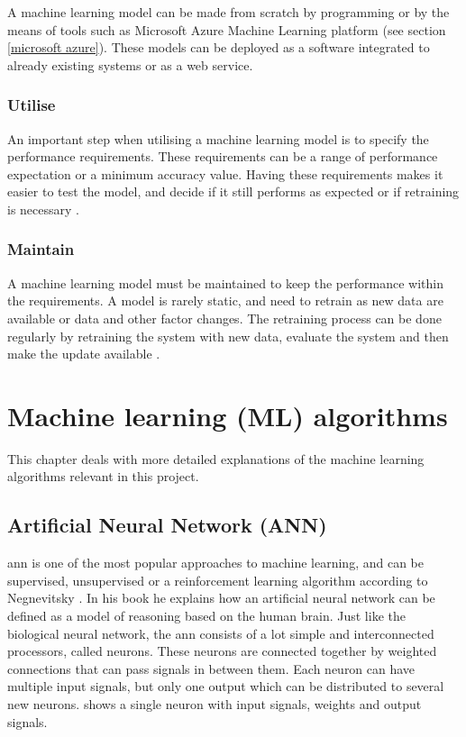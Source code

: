 \documentclass[english, a4paper]{report}
\begin{document}
{{{            A machine learning model can be made from scratch by programming or by the means of tools such as Microsoft Azure Machine Learning platform (see section \ref{microsoft azure}). These models can be deployed as a software integrated to already existing systems or as a web service. 

            \subsubsection{Utilise}
            {
                An important step when utilising a machine learning model is to specify the performance requirements. These requirements can be a range of performance expectation or a minimum accuracy value. Having these requirements makes it easier to test the model, and decide if it still performs as expected or if retraining is necessary \cite{mlMarsland}. 
            }
            
            \subsubsection{Maintain}
            {
                A machine learning model must be maintained to keep the performance within the requirements. A model is rarely static, and need to retrain as new data are available or data and other factor changes. The retraining process can be done regularly by retraining the system with new data, evaluate the system and then make the update available \cite{deployML}. 
            }
        }
    }
    
    \section{Machine learning (ML) algorithms}\label{algorithms}
    {
        This chapter deals with more detailed explanations of the machine learning algorithms relevant in this project.
        
        \subsection{Artificial Neural Network (ANN)}\label{annTheroy}
        {
            \gls{ann} is one of the most popular approaches to machine learning, and can be supervised, unsupervised or a reinforcement learning algorithm according to Negnevitsky \cite{artificialIntelligence}. In his book he explains how an artificial neural network can be defined as a model of reasoning based on the human brain. Just like the biological neural network, the \gls{ann} consists of a lot simple and interconnected processors, called neurons. These neurons are connected together by weighted connections that can pass signals in between them. Each neuron can have multiple input signals, but only one output which can be distributed to several new neurons.  shows a single neuron with input signals, weights and output signals.  
            \par
            
}}}
\end{document}

